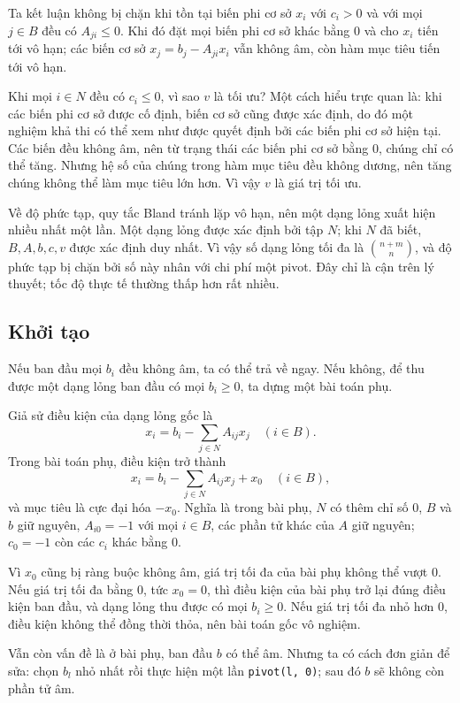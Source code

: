 \documentclass[11pt]{article}
\begin{document}
Ta kết luận không bị chặn khi tồn tại biến phi cơ sở $x_i$ với $c_i>0$ và với
mọi $j\in B$ đều có $A_{ji}\le 0$. Khi đó đặt mọi biến phi cơ sở khác bằng
$0$ và cho $x_i$ tiến tới vô hạn; các biến cơ sở
$x_j=b_j-A_{ji}x_i$ vẫn không âm, còn hàm mục tiêu tiến tới vô hạn.

Khi mọi $i\in N$ đều có $c_i\le 0$, vì sao $v$ là tối ưu? Một cách hiểu trực
quan là: khi các biến phi cơ sở được cố định, biến cơ sở cũng được xác định,
do đó một nghiệm khả thi có thể xem như được quyết định bởi các biến phi cơ
sở hiện tại. Các biến đều không âm, nên từ trạng thái các biến phi cơ sở bằng
$0$, chúng chỉ có thể tăng. Nhưng hệ số của chúng trong hàm mục tiêu đều
không dương, nên tăng chúng không thể làm mục tiêu lớn hơn. Vì vậy $v$ là giá
trị tối ưu.

Về độ phức tạp, quy tắc Bland tránh lặp vô hạn, nên một dạng lỏng xuất hiện
nhiều nhất một lần. Một dạng lỏng được xác định bởi tập $N$; khi $N$ đã biết,
$B,A,b,c,v$ được xác định duy nhất. Vì vậy số dạng lỏng tối đa là
$\binom{n+m}{n}$, và độ phức tạp bị chặn bởi số này nhân với chi phí một
pivot. Đây chỉ là cận trên lý thuyết; tốc độ thực tế thường thấp hơn rất
nhiều.

\subsection{Khởi tạo}

Nếu ban đầu mọi $b_i$ đều không âm, ta có thể trả về ngay. Nếu không, để thu
được một dạng lỏng ban đầu có mọi $b_i\ge 0$, ta dựng một bài toán phụ.

Giả sử điều kiện của dạng lỏng gốc là
\[
  x_i=b_i-\sum_{j\in N} A_{ij}x_j\quad (i\in B).
\]
Trong bài toán phụ, điều kiện trở thành
\[
  x_i=b_i-\sum_{j\in N} A_{ij}x_j+x_0\quad (i\in B),
\]
và mục tiêu là cực đại hóa $-x_0$. Nghĩa là trong bài phụ, $N$ có thêm chỉ số
$0$, $B$ và $b$ giữ nguyên, $A_{i0}=-1$ với mọi $i\in B$, các phần tử khác
của $A$ giữ nguyên; $c_0=-1$ còn các $c_i$ khác bằng $0$.

Vì $x_0$ cũng bị ràng buộc không âm, giá trị tối đa của bài phụ không thể
vượt $0$. Nếu giá trị tối đa bằng $0$, tức $x_0=0$, thì điều kiện của bài phụ
trở lại đúng điều kiện ban đầu, và dạng lỏng thu được có mọi $b_i\ge 0$. Nếu
giá trị tối đa nhỏ hơn $0$, điều kiện không thể đồng thời thỏa, nên bài toán
gốc vô nghiệm.

Vẫn còn vấn đề là ở bài phụ, ban đầu $b$ có thể âm. Nhưng ta có cách đơn giản
để sửa: chọn $b_l$ nhỏ nhất rồi thực hiện một lần \texttt{pivot(l, 0)}; sau
đó $b$ sẽ không còn phần tử âm.
\end{document}
